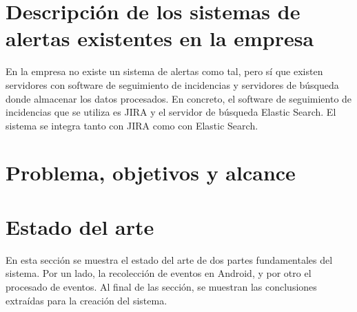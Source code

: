 \section{Descripción de los sistemas de alertas existentes en la empresa}
En la empresa no existe un sistema de alertas como tal, pero sí que existen servidores con software de seguimiento de incidencias y servidores de búsqueda donde almacenar los datos procesados. En concreto, el software de seguimiento de incidencias que se utiliza es JIRA\cite{Tfg:jira} y el servidor de búsqueda Elastic Search\cite{Tfg:elasticsearch}. El sistema se integra tanto con JIRA como con Elastic Search.

\section{Problema, objetivos y alcance}



\section{Estado del arte}
En esta sección se muestra el estado del arte de dos partes fundamentales del sistema. Por un lado, la recolección de eventos en Android, y por otro el procesado de eventos. Al final de las sección, se muestran las conclusiones extraídas para la creación del sistema.

